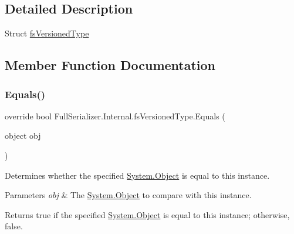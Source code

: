 \subsection{Detailed Description}
Struct \hyperlink{struct_full_serializer_1_1_internal_1_1fs_versioned_type}{fs\+Versioned\+Type} 



\subsection{Member Function Documentation}
\mbox{\label{struct_full_serializer_1_1_internal_1_1fs_versioned_type_a03287eaf9b0c058981d26039ee69e12d}} 
\subsubsection{\texorpdfstring{Equals()}{Equals()}}
{\footnotesize\ttfamily override bool Full\+Serializer.\+Internal.\+fs\+Versioned\+Type.\+Equals (\begin{DoxyParamCaption}\item[{object}]{obj }\end{DoxyParamCaption})\hspace{0.3cm}{\ttfamily [inline]}}



Determines whether the specified \hyperlink{namespace_full_serializer_a6eee33d63b94e40fdfcfc59af9fcfc82a497031794414a552435f90151ac3b54b}{System.\+Object} is equal to this instance. 


\begin{DoxyParams}{Parameters}
{\em obj} & The \hyperlink{namespace_full_serializer_a6eee33d63b94e40fdfcfc59af9fcfc82a497031794414a552435f90151ac3b54b}{System.\+Object} to compare with this instance.\\
\hline
\end{DoxyParams}
\begin{DoxyReturn}{Returns}
{\ttfamily true} if the specified \hyperlink{namespace_full_serializer_a6eee33d63b94e40fdfcfc59af9fcfc82a497031794414a552435f90151ac3b54b}{System.\+Object} is equal to this instance; otherwise, {\ttfamily false}.
\end{DoxyReturn}
\mbox{\label{struct_full_serializer_1_1_internal_1_1fs_versioned_type_a6c89963039a787e467fbb6b14314f190}} 
